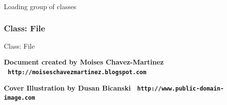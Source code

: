 \documentclass[11pt,twoside,openany,x11names,svgnames]{memoir}
\begin{document}
Loading group of classes

\subsubsection{Class: File}\label{Class-File}

Class: File

\cleartoverso


\enlargethispage{3\baselineskip}
\thispagestyle{empty}
\pagecolor[HTML]{0E0407}

\begin{center}
\begin{minipage}{.8\textwidth}
\color{Cornsilk}\Large\bfseries

\end{minipage}
\end{center}


\begin{center}

\vspace*{\baselineskip}

\textbf{\textcolor{LightGoldenrod!50!Gold}{Document created by Moises Chavez-Martinez \textbullet\ \texttt{http://moiseschavezmartinez.blogspot.com}}}

\vspace*{\baselineskip}

\textbf{\textcolor{LightGoldenrod}{Cover Illustration by Dusan Bicanski \textbullet\ \texttt{http://www.public-domain-image.com}}}
\end{center}
\end{document}
